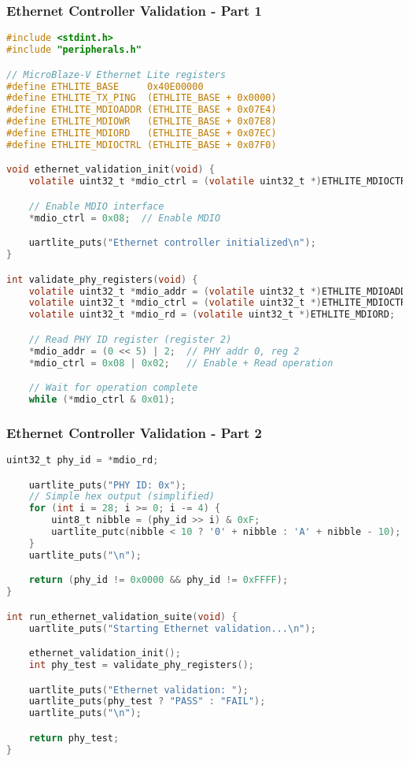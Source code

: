 \documentclass{beamer}
\begin{document}
\begin{frame}[fragile]
\frametitle{Ethernet Controller Validation - Part 1}
\begin{lstlisting}[language=C, basicstyle=\fontsize{5}{2}\selectfont\ttfamily, backgroundcolor={}]
#include <stdint.h>
#include "peripherals.h"

// MicroBlaze-V Ethernet Lite registers
#define ETHLITE_BASE     0x40E00000
#define ETHLITE_TX_PING  (ETHLITE_BASE + 0x0000)
#define ETHLITE_MDIOADDR (ETHLITE_BASE + 0x07E4)
#define ETHLITE_MDIOWR   (ETHLITE_BASE + 0x07E8)
#define ETHLITE_MDIORD   (ETHLITE_BASE + 0x07EC)
#define ETHLITE_MDIOCTRL (ETHLITE_BASE + 0x07F0)

void ethernet_validation_init(void) {
    volatile uint32_t *mdio_ctrl = (volatile uint32_t *)ETHLITE_MDIOCTRL;

    // Enable MDIO interface
    *mdio_ctrl = 0x08;  // Enable MDIO

    uartlite_puts("Ethernet controller initialized\n");
}

int validate_phy_registers(void) {
    volatile uint32_t *mdio_addr = (volatile uint32_t *)ETHLITE_MDIOADDR;
    volatile uint32_t *mdio_ctrl = (volatile uint32_t *)ETHLITE_MDIOCTRL;
    volatile uint32_t *mdio_rd = (volatile uint32_t *)ETHLITE_MDIORD;

    // Read PHY ID register (register 2)
    *mdio_addr = (0 << 5) | 2;  // PHY addr 0, reg 2
    *mdio_ctrl = 0x08 | 0x02;   // Enable + Read operation

    // Wait for operation complete
    while (*mdio_ctrl & 0x01);
\end{lstlisting}
\end{frame}

\begin{frame}[fragile]
\frametitle{Ethernet Controller Validation - Part 2}
\begin{lstlisting}[language=C, basicstyle=\fontsize{5}{2}\selectfont\ttfamily, backgroundcolor={}]
    uint32_t phy_id = *mdio_rd;

    uartlite_puts("PHY ID: 0x");
    // Simple hex output (simplified)
    for (int i = 28; i >= 0; i -= 4) {
        uint8_t nibble = (phy_id >> i) & 0xF;
        uartlite_putc(nibble < 10 ? '0' + nibble : 'A' + nibble - 10);
    }
    uartlite_puts("\n");

    return (phy_id != 0x0000 && phy_id != 0xFFFF);
}

int run_ethernet_validation_suite(void) {
    uartlite_puts("Starting Ethernet validation...\n");

    ethernet_validation_init();
    int phy_test = validate_phy_registers();

    uartlite_puts("Ethernet validation: ");
    uartlite_puts(phy_test ? "PASS" : "FAIL");
    uartlite_puts("\n");

    return phy_test;
}
\end{lstlisting}
\end{frame}
\end{document}
